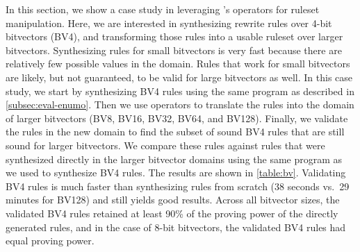In this section, we show a case study in leveraging \enumo's operators for
  ruleset manipulation.
Here, we are interested in synthesizing rewrite rules over 4-bit bitvectors
  (BV4), and transforming those rules into a usable ruleset over
  larger bitvectors.
Synthesizing rules for small bitvectors is very fast because there are
  relatively few possible values in the domain.
Rules that work for small bitvectors are likely, but not guaranteed, to be
  valid for large bitvectors as well.
In this case study, we start by synthesizing BV4 rules using
  the same \enumo program as described in \autoref{subsec:eval-enumo}.
Then we use \enumo operators to translate the rules into the domain of larger
  bitvectors (BV8, BV16, BV32, BV64, and BV128).
Finally, we validate the rules in the new domain to find the subset of sound BV4
  rules that are still sound for larger bitvectors.
We compare these rules against rules that were synthesized directly in the
  larger bitvector domains using the same \enumo program as we used to
  synthesize BV4 rules.
The results are shown in \autoref{table:bv}.
Validating BV4 rules is much
  faster than synthesizing rules from scratch
  (38 seconds vs.\ 29 minutes for BV128)
  and still yields good results.
Across all bitvector sizes, the validated BV4 rules retained at least 90\% of
  the proving power of the directly generated rules, and in the case of
  8-bit bitvectors, the validated BV4 rules had equal proving power.

